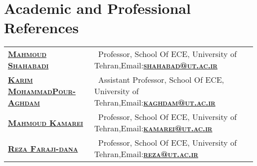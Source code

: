 \documentclass[a4paper,10pt]{article} %
\begin{document}
\color{blue}
\section{Academic and Professional References}
\color{Black}
\begin{tabular}{ll}
	
	
	\textsc{\href{http://ece.ut.ac.ir/en/users/shahabadi}{\bf{Mahmoud Shahabadi}}}&    \  Professor, School Of ECE, University of Tehran,Email:\textsc{\href{mailto:Shahabad@ut.ac.ir}{\bf{shahabad@ut.ac.ir}}}\\
	
	\textsc{\href{http://ece.ut.ac.ir/en/users/mohammadpour}{\bf{Karim MohammadPour-Aghdam}}}&  \ Assistant Professor, School Of ECE, University of Tehran,Email:\textsc{\href{mailto:kaghdam@ut.ac.ir}{\bf{kaghdam@ut.ac.ir}}}\\
	
	\textsc{\href{http://ece.ut.ac.ir/en/users/kamarei}{\bf{Mahmoud Kamarei}}}&
	\ Professor, School Of ECE, University of Tehran,Email:\textsc{\href{mailto:kamarei@ut.ac.ir}{\bf{kamarei@ut.ac.ir}}}\\
	
	\textsc{\href{http://ece.ut.ac.ir/en/users/faraji}{\bf{Reza Faraji-dana}}}&
	\ Professor, School Of ECE, University of Tehran,Email:\textsc{\href{mailto:reza@ut.ac.ir}{\bf{reza@ut.ac.ir}}}\\
	
	
	
\end{tabular}
\end{document}
